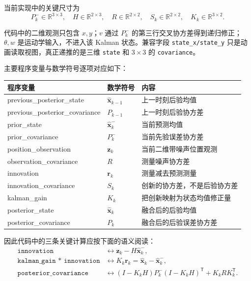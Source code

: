\documentclass[UTF8,a4paper,11pt]{ctexart}
\newcommand{\prior}{^{-}}
\newcommand{\transpose}{^{\mathsf T}}
\begin{document}
当前实现中的关键尺寸为
\begin{equation}
P_k\prior\in\mathbb R^{3\times3},\quad
H\in\mathbb R^{2\times3},\quad
R\in\mathbb R^{2\times2},\quad
S_k\in\mathbb R^{2\times2},\quad
K_k\in\mathbb R^{3\times2}.
\end{equation}

代码中的二维观测只包含 $x,y$；$v$ 通过 $P_k\prior$ 的第三行交叉协方差得到递归修正；$\theta,w$ 是运动学输入，不进入该 Kalman 状态。兼容字段 \texttt{state\_x/state\_y} 只是动画读取视图，真正递推的是三维 \texttt{state} 和 $3\times3$ 的 \texttt{covariance}。

主要程序变量与数学符号逐项对应如下：
\begin{center}
\begin{tabularx}{0.96\textwidth}{>{\ttfamily\small}p{48mm}>{\centering\arraybackslash}p{22mm}X}
\toprule
\normalfont 程序变量 & 数学符号 & 内容\\
\midrule
previous\_posterior\_state & $\hat{\bm x}_{k-1}$ & 上一时刻后验均值\\
previous\_posterior\_\newline covariance & $P_{k-1}$ & 上一时刻后验协方差\\
prior\_state & $\hat{\bm x}_k\prior$ & 当前预测均值\\
prior\_covariance & $P_k\prior$ & 当前先验误差协方差\\
position\_observation & $\bm z_k$ & 当前二维带噪声位置观测\\
observation\_covariance & $R$ & 测量噪声协方差\\
innovation & $\bm r_k$ & 测量减去预测测量\\
innovation\_covariance & $S_k$ & 创新的协方差，不是后验协方差\\
kalman\_gain & $K_k$ & 把创新映射为状态均值修正量\\
posterior\_state & $\hat{\bm x}_k$ & 融合后的后验均值\\
posterior\_covariance & $P_k$ & 融合后的后验误差协方差\\
\bottomrule
\end{tabularx}
\end{center}

因此代码中的三条关键计算应按下面的语义阅读：
\begin{align}
\texttt{innovation}
&\longleftrightarrow \bm z_k-H\hat{\bm x}_k\prior,\\
\texttt{kalman\_gain * innovation}
&\longleftrightarrow K_k\bm r_k
=\hat{\bm x}_k-\hat{\bm x}_k\prior,\\
\texttt{posterior\_covariance}
&\longleftrightarrow
(I-K_kH)P_k\prior(I-K_kH)\transpose+K_kRK_k\transpose.
\end{align}
\end{document}
